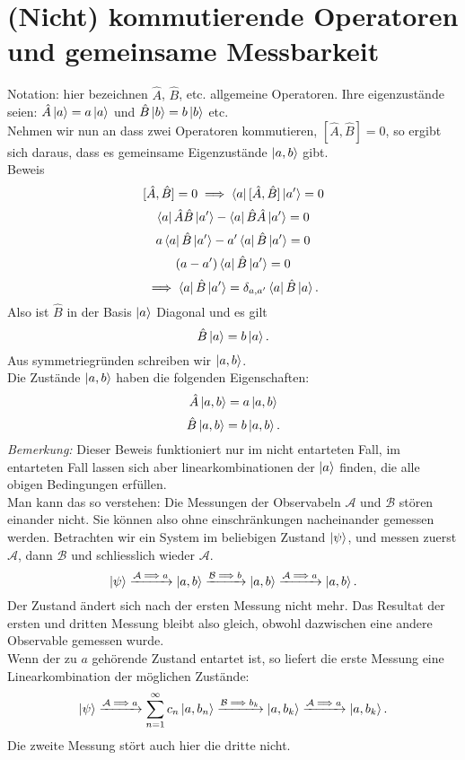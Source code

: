 \documentclass{report}
\begin{document}
 \section{(Nicht) kommutierende Operatoren und gemeinsame Messbarkeit}
Notation: hier bezeichnen $\hat{A}$, $\hat{B}$, etc. allgemeine Operatoren. Ihre eigenzustände seien: $\hat{A} \ket{a} = a \ket{a} $ und $\hat{B} \ket{b} = b \ket{b} $ etc. \\
Nehmen wir nun an dass zwei Operatoren kommutieren, $[\hat{A}, \hat{B}] = 0$, so ergibt sich daraus, dass es gemeinsame Eigenzustände $\ket{a, b} $ gibt. \\
Beweis \[
	[\hat{A}, \hat{B}] = 0 \implies \bra{a} [\hat{A}, \hat{B}] \ket{a'} = 0
\] \[
\bra{a} \hat{A}\hat{B} \ket{a'} - \bra{a} \hat{B}\hat{A} \ket{a'} = 0 
\] \[
a \bra{a} \hat{B} \ket{a'}  - a' \bra{a} \hat{B} \ket{a'} = 0
\] \[
(a - a') \bra{a} \hat{B} \ket{a'} = 0
\] \[
\implies \bra{a} \hat{B} \ket{a'} = \delta_{a,a'} \bra{a} \hat{B} \ket{a} 
.\] Also ist $\hat{B}$ in der Basis $\ket{a} $ Diagonal und es gilt \[
\hat{B} \ket{a} = b \ket{a} 
.\] Aus symmetriegründen schreiben wir $\ket{a, b} $. \\
Die Zustände $\ket{a, b} $ haben die folgenden Eigenschaften: \[
\hat{A} \ket{a, b}  = a \ket{a, b} 
\] \[
\hat{B} \ket{a, b} =  b \ket{a,b} 
.\]  \emph{Bemerkung:} Dieser Beweis funktioniert nur im nicht entarteten Fall, im entarteten Fall lassen sich aber linearkombinationen der $\ket{a} $ finden, die alle obigen Bedingungen erfüllen. \\
Man kann das so verstehen: Die Messungen der Observabeln $\mathcal{A}$ und $\mathcal{B}$ stören einander nicht.
Sie können also ohne einschränkungen nacheinander gemessen werden. Betrachten wir ein System im beliebigen Zustand $\ket{\psi} $, und messen zuerst $\mathcal{A}$, dann $\mathcal{B}$ und schliesslich wieder $\mathcal{A}$. \[
	\ket{\psi} \xrightarrow{\mathcal{A} \implies a} \ket{a,b} \xrightarrow{\mathcal{B} \implies b} \ket{a,b} \xrightarrow{\mathcal{A} \implies a} \ket{a,b}   
.\] Der Zustand ändert sich nach der ersten Messung nicht mehr. Das Resultat der ersten und dritten Messung bleibt also gleich, obwohl dazwischen eine andere Observable gemessen wurde. \\
Wenn der zu $a$ gehörende Zustand entartet ist, so liefert die erste Messung eine Linearkombination der möglichen Zustände: \[
	\ket{\psi} \xrightarrow{\mathcal{A} \implies a} \sum_{n=1}^{\infty} c_n \ket{a, b_n}  \xrightarrow{\mathcal{B} \implies b_k} \ket{a,b_k} \xrightarrow{\mathcal{A} \implies a} \ket{a,b_k}   
.\] Die zweite Messung stört auch hier die dritte nicht. \\
\end{document}
